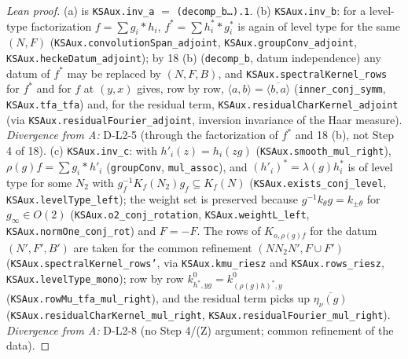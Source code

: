 \begin{proof}[Lean proof]
(a) is \texttt{KSAux.inv\_a} $=$ \texttt{(decomp\_b\ldots).1}. (b) \texttt{KSAux.inv\_b}: for a level-type factorization $f=\sum g_i\ast h_i$, $f^*=\sum h_i^*\ast g_i^*$ is again of level type for the same $(N,F)$ (\texttt{KSAux.convolutionSpan\_adjoint}, \texttt{KSAux.groupConv\_adjoint}, \texttt{KSAux.heckeDatum\_adjoint}); by 18 (b) (\texttt{decomp\_b}, datum independence) any datum of $f^*$ may be replaced by $(N,F,B)$, and \texttt{KSAux.spectralKernel\_rows} for $f^*$ and for $f$ at $(y,x)$ gives, row by row, $\langle a,b\rangle=\overline{\langle b,a\rangle}$ (\texttt{inner\_conj\_symm}, \texttt{KSAux.tfa\_tfa}) and, for the residual term, \texttt{KSAux.residualCharKernel\_adjoint} (via \texttt{KSAux.residualFourier\_adjoint}, inversion invariance of the Haar measure). \emph{Divergence from A:} D-L2-5 (through the factorization of $f^*$ and 18 (b), not Step 4 of 18). (c) \texttt{KSAux.inv\_c}: with $h'_i(z)=h_i(zg)$ (\texttt{KSAux.smooth\_mul\_right}), $\rho(g)f=\sum g_i\ast h'_i$ (\texttt{groupConv}, \texttt{mul\_assoc}), and $(h'_i)^*=\lambda(g)h_i^*$ is of level type for some $N_2$ with $g_f^{-1}K_f(N_2)g_f\subseteq K_f(N)$ (\texttt{KSAux.exists\_conj\_level}, \texttt{KSAux.levelType\_left}); the weight set is preserved because $g^{-1}k_\theta g=k_{\pm\theta}$ for $g_\infty\in O(2)$ (\texttt{KSAux.o2\_conj\_rotation}, \texttt{KSAux.weightL\_left}, \texttt{KSAux.normOne\_conj\_rot}) and $F=-F$. The rows of $K_{o,\rho(g)f}$ for the datum $(N',F',B')$ are taken for the common refinement $(NN_2N',F\cup F')$ (\texttt{KSAux.spectralKernel\_rows'}, via \texttt{KSAux.kmu\_riesz} and \texttt{KSAux.rows\_riesz}, \texttt{KSAux.levelType\_mono}); row by row $k^0_{h^*,yg}=k^0_{(\rho(g)h)^*,y}$ (\texttt{KSAux.rowMu\_tfa\_mul\_right}), and the residual term picks up $\overline{\eta_\nu(g)}$ (\texttt{KSAux.residualCharKernel\_mul\_right}, \texttt{KSAux.residualFourier\_mul\_right}). \emph{Divergence from A:} D-L2-8 (no Step 4/(Z) argument; common refinement of the data).
\end{proof}

